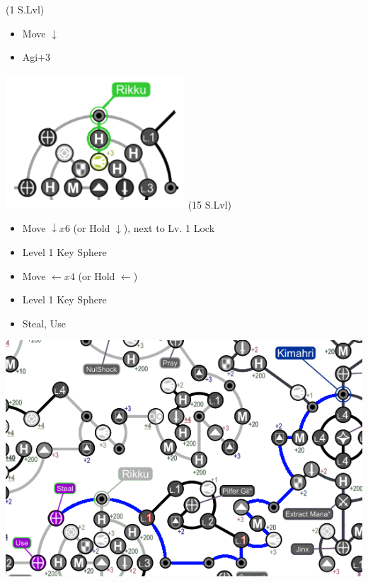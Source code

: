 \begin{spheregrid}
    \begin{multicols}{2}
        \begin{itemize}
            \rikkuf (1 S.Lvl)
            \begin{itemize}
                \item Move $\downarrow$
                \item Agi+3
            \end{itemize}
            \includegraphics[width=.5\columnwidth]{graphics/macalaniarikku}
            \kimahrif (15 S.Lvl)
            \begin{itemize}
                \item Move $\downarrow x6$ (or Hold $\downarrow$), next to Lv. 1 Lock
                \item Level 1 Key Sphere
                \item Move $\leftarrow x4$ (or Hold $\leftarrow$)
                \item Level 1 Key Sphere
                \columnbreak
                \item Steal, Use
            \end{itemize}
            \includegraphics[width=.8\columnwidth]{graphics/Kimahri_post_spheremorph}
        \end{itemize}
    \end{multicols}
\end{spheregrid}
